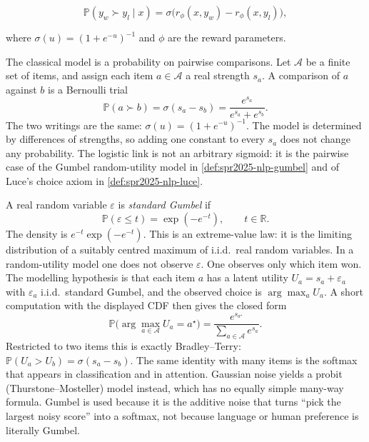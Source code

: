 \documentclass[11pt,a4paper]{article}
\theoremstyle{definition}
\begin{document}
\[
\mathbb{P}(y_w\succ y_l\mid x)
=\sigma\bigl(r_\phi(x,y_w)-r_\phi(x,y_l)\bigr),
\]

where \(\sigma(u)=(1+e^{-u})^{-1}\) and \(\phi\) are the reward parameters.

\begin{definition}\label{def:spr2025-nlp-bradley-terry}
The classical model is a probability on pairwise comparisons. Let \(\mathcal{A}\) be a finite set of items, and assign each item \(a\in\mathcal{A}\) a real strength \(s_a\). A comparison of \(a\) against \(b\) is a Bernoulli trial
\[
\mathbb{P}(a\succ b)
=\sigma(s_a-s_b)
=\frac{e^{s_a}}{e^{s_a}+e^{s_b}}.
\]
The two writings are the same: \(\sigma(u)=(1+e^{-u})^{-1}\). The model is determined by differences of strengths, so adding one constant to every \(s_a\) does not change any probability. The logistic link is not an arbitrary sigmoid: it is the pairwise case of the Gumbel random-utility model in \cref{def:spr2025-nlp-gumbel} and of Luce's choice axiom in \cref{def:spr2025-nlp-luce}.
\end{definition}

\begin{definition}\label{def:spr2025-nlp-gumbel}
A real random variable \(\varepsilon\) is \emph{standard Gumbel} if
\[
\mathbb{P}(\varepsilon\leq t)
=\exp(-e^{-t}),
\qquad t\in\mathbb{R}.
\]
The density is \(e^{-t}\exp(-e^{-t})\). This is an extreme-value law: it is the limiting distribution of a suitably centred maximum of i.i.d.\ real random variables. In a random-utility model one does not observe \(\varepsilon\). One observes only which item won. The modelling hypothesis is that each item \(a\) has a latent utility \(U_a=s_a+\varepsilon_a\) with \(\varepsilon_a\) i.i.d.\ standard Gumbel, and the observed choice is \(\arg\max_a U_a\). A short computation with the displayed CDF then gives the closed form
\[
\mathbb{P}\bigl(\arg\max_{a\in\mathcal{A}}U_a=a^\star\bigr)
=\frac{e^{s_{a^\star}}}{\sum_{a\in\mathcal{A}}e^{s_a}}.
\]
Restricted to two items this is exactly Bradley--Terry: \(\mathbb{P}(U_a>U_b)=\sigma(s_a-s_b)\). The same identity with many items is the softmax that appears in classification and in attention. Gaussian noise yields a probit (Thurstone--Mosteller) model instead, which has no equally simple many-way formula. Gumbel is used because it is the additive noise that turns ``pick the largest noisy score'' into a softmax, not because language or human preference is literally Gumbel.
\end{definition}
\end{document}
